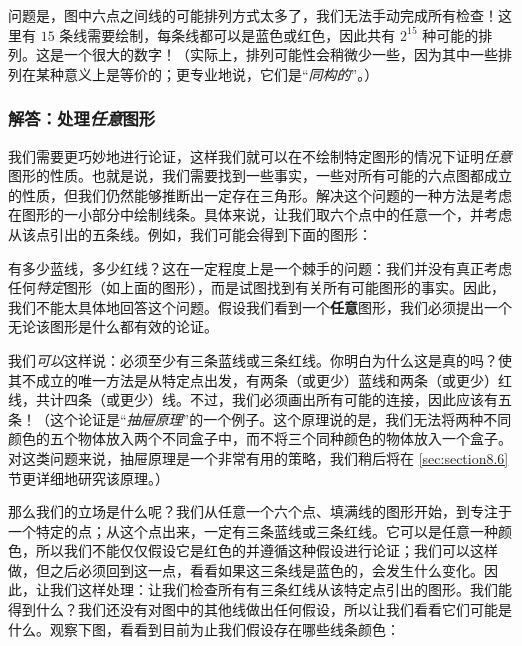问题是，图中六点之间线的可能排列方式太多了，我们无法手动完成所有检查！这里有 $15$ 条线需要绘制，每条线都可以是蓝色或红色，因此共有 $2^{15}$ 种可能的排列。这是一个很大的数字！（实际上，排列可能性会稍微少一些，因为其中一些排列在某种意义上是等价的；更专业地说，它们是``\emph{同构的}''。）

\subsubsection*{解答：处理\emph{任意}图形}

我们需要更巧妙地进行论证，这样我们就可以在不绘制特定图形的情况下证明\emph{任意}图形的性质。也就是说，我们需要找到一些事实，一些对所有可能的六点图都成立的性质，但我们仍然能够推断出一定存在三角形。解决这个问题的一种方法是考虑在图形的一小部分中绘制线条。具体来说，让我们取六个点中的任意一个，并考虑从该点引出的五条线。例如，我们可能会得到下面的图形：

\begin{center}
\end{center}

有多少蓝线，多少红线？这在一定程度上是一个棘手的问题：我们并没有真正考虑任何\emph{特定}图形（如上面的图形），而是试图找到有关所有可能图形的事实。因此，我们不能太具体地回答这个问题。假设我们看到一个\textbf{任意}图形，我们必须提出一个无论该图形是什么都有效的论证。 

我们\emph{可以}这样说：必须至少有三条蓝线或三条红线。你明白为什么这是真的吗？使其不成立的唯一方法是从特定点出发，有两条（或更少）蓝线和两条（或更少）红线，共计四条（或更少）线。不过，我们必须画出所有可能的连接，因此应该有五条！（这个论证是``\emph{抽屉原理}''的一个例子。这个原理说的是，我们无法将两种不同颜色的五个物体放入两个不同盒子中，而不将三个同种颜色的物体放入一个盒子。对这类问题来说，抽屉原理是一个非常有用的策略，我们稍后将在 \ref{sec:section8.6} 节更详细地研究该原理。）

那么我们的立场是什么呢？我们从任意一个六个点、填满线的图形开始，到专注于一个特定的点；从这个点出来，一定有三条蓝线或三条红线。它可以是任意一种颜色，所以我们不能仅仅假设它是红色的并遵循这种假设进行论证；我们可以这样做，但之后必须回到这一点，看看如果这三条线是蓝色的，会发生什么变化。因此，让我们这样处理：让我们检查所有有三条红线从该特定点引出的图形。我们能得到什么？我们还没有对图中的其他线做出任何假设，所以让我们看看它们可能是什么。观察下图，看看到目前为止我们假设存在哪些线条颜色：

